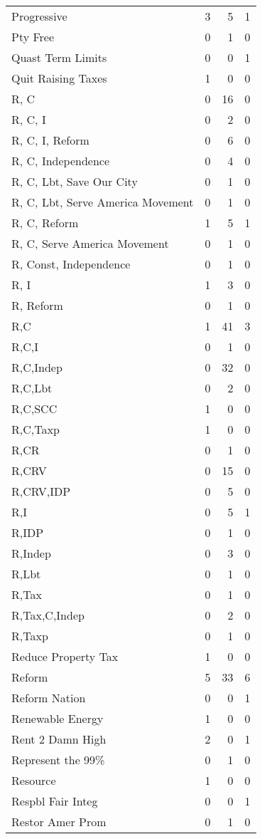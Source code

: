 \begin{supertabular}{lrrr}
Progressive & 3 & 5 & 1\\
Pty Free & 0 & 1 & 0\\
Quast Term Limits & 0 & 0 & 1\\
Quit Raising Taxes & 1 & 0 & 0\\
R, C & 0 & 16 & 0\\
R, C, I & 0 & 2 & 0\\
R, C, I, Reform & 0 & 6 & 0\\
R, C, Independence & 0 & 4 & 0\\
R, C, Lbt, Save Our City & 0 & 1 & 0\\
R, C, Lbt, Serve America Movement & 0 & 1 & 0\\
R, C, Reform & 1 & 5 & 1\\
R, C, Serve America Movement & 0 & 1 & 0\\
R, Const, Independence & 0 & 1 & 0\\
R, I & 1 & 3 & 0\\
R, Reform & 0 & 1 & 0\\
R,C & 1 & 41 & 3\\
R,C,I & 0 & 1 & 0\\
R,C,Indep & 0 & 32 & 0\\
R,C,Lbt & 0 & 2 & 0\\
R,C,SCC & 1 & 0 & 0\\
R,C,Taxp & 1 & 0 & 0\\
R,CR & 0 & 1 & 0\\
R,CRV & 0 & 15 & 0\\
R,CRV,IDP & 0 & 5 & 0\\
R,I & 0 & 5 & 1\\
R,IDP & 0 & 1 & 0\\
R,Indep & 0 & 3 & 0\\
R,Lbt & 0 & 1 & 0\\
R,Tax & 0 & 1 & 0\\
R,Tax,C,Indep & 0 & 2 & 0\\
R,Taxp & 0 & 1 & 0\\
Reduce Property Tax & 1 & 0 & 0\\
Reform & 5 & 33 & 6\\
Reform Nation & 0 & 0 & 1\\
Renewable Energy & 1 & 0 & 0\\
Rent 2 Damn High & 2 & 0 & 1\\
Represent the 99\% & 0 & 1 & 0\\
Resource & 1 & 0 & 0\\
Respbl Fair Integ & 0 & 0 & 1\\
Restor Amer Prom & 0 & 1 & 0\\

\end{supertabular}
